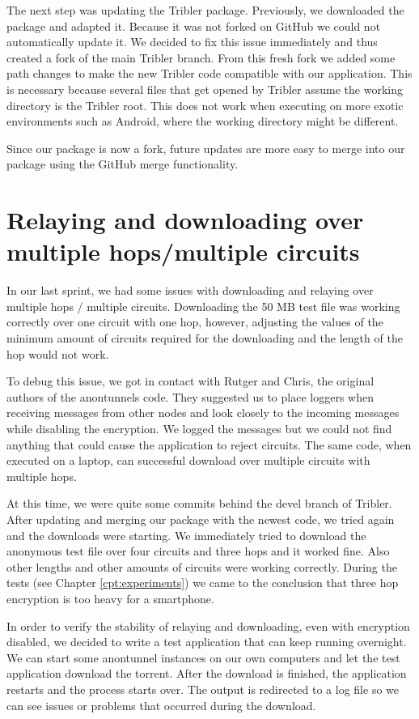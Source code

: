 		The next step was updating the Tribler package. Previously, we downloaded the package and adapted it. Because it was not forked on GitHub we could not automatically update it. We decided to fix this issue immediately and thus created a fork of the main Tribler branch. From this fresh fork we added some path changes to make the new Tribler code compatible with our application. This is necessary because several files that get opened by Tribler assume the working directory is the Tribler root. This does not work when executing on more exotic environments such as Android, where the working directory might be different.
		
		Since our package is now a fork, future updates are more easy to merge into our package using the GitHub merge functionality.
			
	\section{Relaying and downloading over multiple hops/multiple circuits}
		In our last sprint, we had some issues with downloading and relaying over multiple hops / multiple circuits. Downloading the 50 MB test file was working correctly over one circuit with one hop, however, adjusting the values of the minimum amount of circuits required for the downloading and the length of the hop would not work.
		
		To debug this issue, we got in contact with Rutger and Chris, the original authors of the anontunnels code. They suggested us to place loggers when receiving messages from other nodes and look closely to the incoming messages while disabling the encryption. We logged the messages but we could not find anything that could cause the application to reject circuits. The same code, when executed on a laptop, can successful download over multiple circuits with multiple hops.
		
		At this time, we were quite some commits behind the devel branch of Tribler. After updating and merging our package with the newest code, we tried again and the downloads were starting. We immediately tried to download the anonymous test file over four circuits and three hops and it worked fine. Also other lengths and other amounts of circuits were working correctly. During the tests (see Chapter \ref{cpt:experiments}) we came to the conclusion that three hop encryption is too heavy for a smartphone.
		
		In order to verify the stability of relaying and downloading, even with encryption disabled, we decided to write a test application that can keep running overnight. We can start some anontunnel instances on our own computers and let the test application download the torrent. After the download is finished, the application restarts and the process starts over. The output is redirected to a log file so we can see issues or problems that occurred during the download.
			
